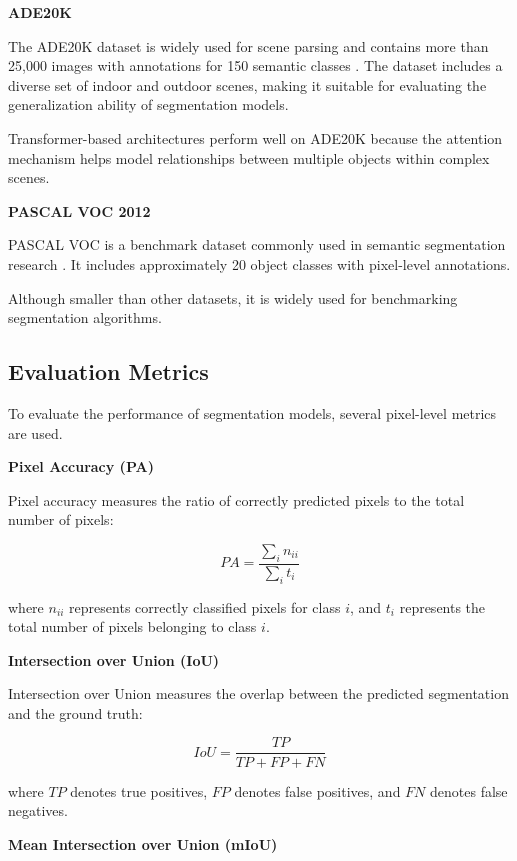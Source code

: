 \textbf{ADE20K}

The ADE20K dataset is widely used for scene parsing and contains more than 25,000 images with annotations for 150 semantic classes \cite{zhou2017scene}. 
The dataset includes a diverse set of indoor and outdoor scenes, making it suitable for evaluating the generalization ability of segmentation models.

Transformer-based architectures perform well on ADE20K because the attention mechanism helps model relationships between multiple objects within complex scenes.

\textbf{PASCAL VOC 2012}

PASCAL VOC is a benchmark dataset commonly used in semantic segmentation research \cite{everingham2010pascal}. 
It includes approximately 20 object classes with pixel-level annotations.

Although smaller than other datasets, it is widely used for benchmarking segmentation algorithms.

\subsection{Evaluation Metrics}

To evaluate the performance of segmentation models, several pixel-level metrics are used.

\textbf{Pixel Accuracy (PA)}

Pixel accuracy measures the ratio of correctly predicted pixels to the total number of pixels:

\begin{equation}
PA = \frac{\sum_i n_{ii}}{\sum_i t_i}
\end{equation}

where $n_{ii}$ represents correctly classified pixels for class $i$, and $t_i$ represents the total number of pixels belonging to class $i$.

\textbf{Intersection over Union (IoU)}

Intersection over Union measures the overlap between the predicted segmentation and the ground truth:

\begin{equation}
IoU = \frac{TP}{TP + FP + FN}
\end{equation}

where $TP$ denotes true positives, $FP$ denotes false positives, and $FN$ denotes false negatives.

\textbf{Mean Intersection over Union (mIoU)}

